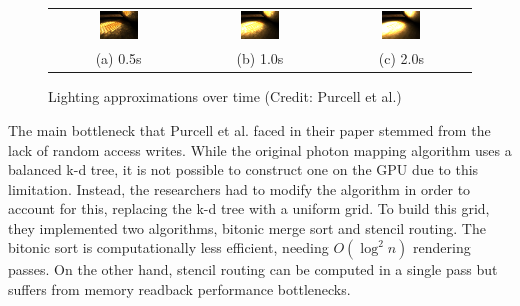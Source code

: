 \begin{figure}[ht]
    \centering
    \begin{tabular}{ccc}
        \includegraphics[width=0.3\textwidth]{img/half-second-glass-ball.png} & \includegraphics[width=0.3\textwidth]{img/one-second-glass-ball.png} & \includegraphics[width=0.3\textwidth]{img/two-second-glass-ball.png} \\
        (a) 0.5s                                                              & (b) 1.0s                                                             & (c) 2.0s
    \end{tabular}
    \captionsetup{justification=centering}
    \caption{Lighting approximations over time (Credit: Purcell et al.)}
    \label{fig:lighting-approximations}
\end{figure}

The main bottleneck that Purcell et al. faced in their paper stemmed from the lack of random access writes. While the original photon mapping algorithm uses a balanced k-d tree, it is not possible to construct one on the GPU due to this limitation. Instead, the researchers had to modify the algorithm in order to account for this, replacing the k-d tree with a uniform grid. To build this grid, they implemented two algorithms, bitonic merge sort and stencil routing. The bitonic sort is computationally less efficient, needing \(O(\log^2 n)\) rendering passes. On the other hand, stencil routing can be computed in a single pass but suffers from memory readback performance bottlenecks.

